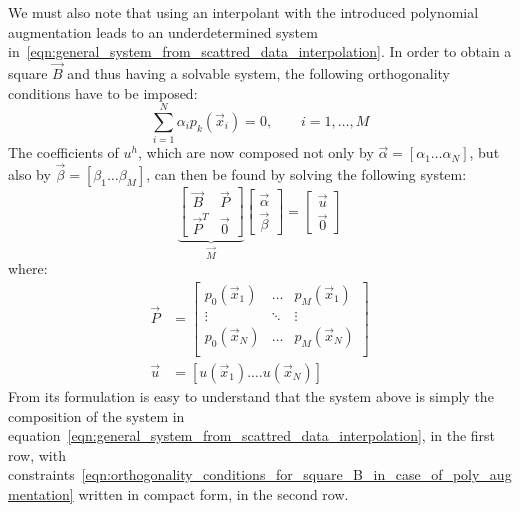 We must also note that using an interpolant with the introduced polynomial augmentation leads to an underdetermined system in~\eqref{eqn:general_system_from_scattred_data_interpolation}. In order to obtain a square $\vec{B}$ and thus having a solvable system, the following orthogonality conditions have to be imposed:
\begin{equation}
	\label{eqn:orthogonality_conditions_for_square_B_in_case_of_poly_augmentation}
	\sum_{i=1}^{N} \alpha_i p_k(\vec{x}_i) = 0, \qquad i=1, \dots, M
\end{equation}
The coefficients of $u^h$, which are now composed not only by $\vec{\alpha} = [\alpha_1 \dots \alpha_N]$, but also by $\vec{\beta} = [\beta_1 \dots \beta_M]$, can then be found by solving the following system:
\begin{equation}
\label{eqn:general_system_from_scattred_data_interpolation_poly_augmentation}
\underbrace{
\begin{bmatrix}
	\vec{B}  & \vec{P}  \\
	\vec{P}^T  & \vec{0}
\end{bmatrix}
}_{\vec{M}}
\begin{bmatrix}
	\vec{\alpha}  \\
	\vec{\beta}
\end{bmatrix}
=
\begin{bmatrix}
	\vec{u}  \\
	\vec{0}
\end{bmatrix}
\end{equation}
where:
\begin{equation}
	\begin{aligned}
		\vec{P} & =
		\begin{bmatrix}
			p_0(\vec{x}_1)  & \dots     & p_M(\vec{x}_1)  \\
			\vdots					 & \ddots  & \vdots						\\
			p_0(\vec{x}_N)  & \dots     & p_M(\vec{x}_N)  \\
		\end{bmatrix}  \\
		\vec{u} & = [u(\vec{x}_1). \dots u(\vec{x}_N)]
	\end{aligned} 
\end{equation}
From its formulation is easy to understand that the system above is simply the composition of the system in equation~\eqref{eqn:general_system_from_scattred_data_interpolation}, in the first row, with constraints~\eqref{eqn:orthogonality_conditions_for_square_B_in_case_of_poly_augmentation} written in compact form, in the second row.


